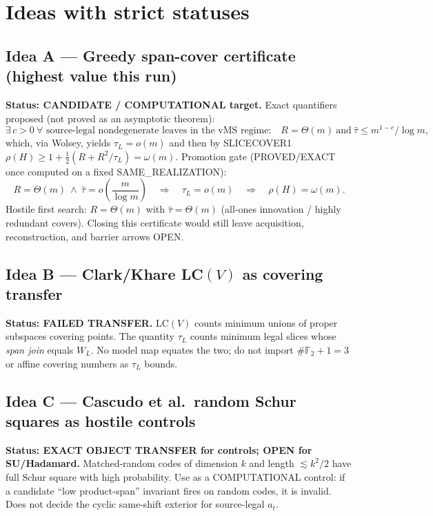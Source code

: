\documentclass[11pt]{article}
\begin{document}
\section*{Ideas with strict statuses}
\subsection*{Idea A --- Greedy span-cover certificate (highest value this run)}
\textbf{Status: CANDIDATE / COMPUTATIONAL target.}
Exact quantifiers proposed (not proved as an asymptotic theorem):
\[
\exists\,c>0\ \forall\text{ source-legal nondegenerate leaves in the vMS regime:}\quad
R=\Theta(m)\ \text{and}\ \widehat\tau\le m^{1-c}/\log m,
\]
which, via Wolsey, yields $\tau_L=o(m)$ and then by SLICECOVER1
$\rho(H)\ge 1+\tfrac12(R+R^2/\tau_L)=\omega(m)$.
Promotion gate (PROVED/EXACT once computed on a fixed SAME\_REALIZATION):
\[
R=\Theta(m)\ \wedge\ \widehat\tau=o\!\left(\frac{m}{\log m}\right)
\quad\Rightarrow\quad
\tau_L=o(m)
\quad\Rightarrow\quad
\rho(H)=\omega(m).
\]
Hostile first search: $R=\Theta(m)$ with $\widehat\tau=\Theta(m)$ (all-ones innovation /
highly redundant covers). Closing this certificate would still leave acquisition, reconstruction,
and barrier arrows OPEN.

\subsection*{Idea B --- Clark/Khare LC$(V)$ as covering transfer}
\textbf{Status: FAILED TRANSFER.}
$\mathrm{LC}(V)$ counts minimum unions of proper subspaces covering points. The quantity $\tau_L$
counts minimum legal slices whose \emph{span join} equals $W_L$. No model map equates the two;
do not import $\#\mathbb F_2+1=3$ or affine covering numbers as $\tau_L$ bounds.

\subsection*{Idea C --- Cascudo et al.\ random Schur squares as hostile controls}
\textbf{Status: EXACT OBJECT TRANSFER for controls; OPEN for SU/Hadamard.}
Matched-random codes of dimension $k$ and length $\lesssim k^2/2$ have full Schur square with
high probability. Use as a COMPUTATIONAL control: if a candidate ``low product-span'' invariant
fires on random codes, it is invalid. Does not decide the cyclic same-shift exterior for
source-legal $a_t$.
\end{document}
